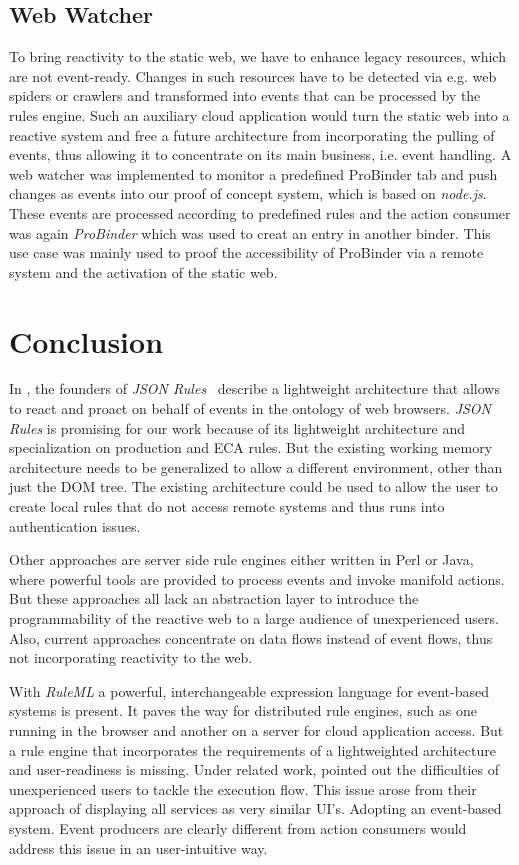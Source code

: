 \documentclass[11pt]{article}%
\begin{document}
\subsection{Web Watcher}
To bring reactivity to the static web, we have to enhance legacy resources, which are not event-ready. Changes in such resources have to be detected via e.g. web spiders or crawlers and transformed into events that can be processed by the rules engine. Such an auxiliary cloud application would turn the static web into a reactive system and free a future architecture from incorporating the pulling of events, thus allowing it to concentrate on its main business, i.e. event handling.
A web watcher was implemented to monitor a predefined ProBinder tab and push changes as events into our proof of concept system, which is based on \emph{node.js}. These events are processed according to predefined rules and the action consumer was again \emph{ProBinder} which was used to creat an entry in another binder. This use case was mainly used to proof the accessibility of ProBinder via a remote system and the activation of the static web.

\section{Conclusion}
In \cite{2009-Pascalau_Giurca-LWAECARE.pdf}, the founders of \emph{JSON Rules}~\cite{2008-Giurca_Pascalau-JSON_Rules.pdf} describe a lightweight architecture that allows to react and proact on behalf of events in the ontology of web browsers. \emph{JSON Rules} is promising for our work because of its lightweight architecture and specialization on production and ECA rules. But the existing working memory architecture needs to be generalized to allow a different environment, other than just the DOM tree. The existing architecture could be used to allow the user to create local rules that do not access remote systems and thus runs into authentication issues.

Other approaches are server side rule engines either written in Perl or Java, where powerful tools are provided to process events and invoke manifold actions. But these approaches all lack an abstraction layer to introduce the programmability of the reactive web to a large audience of unexperienced users. Also, current approaches concentrate on data flows instead of event flows, thus not incorporating reactivity to the web.

With \emph{RuleML} a powerful, interchangeable expression language for event-based systems is present. It paves the way for distributed rule engines, such as one running in the browser and another on a server for cloud application access. But a rule engine that incorporates the requirements of a lightweighted architecture and user-readiness is missing. Under related work, \cite{2010-Namoun_etal-EURCW.pdf} pointed out the difficulties of unexperienced users to tackle the execution flow. This issue arose from their approach of displaying all services as very similar UI's. Adopting an event-based system. Event producers are clearly different from action consumers would address this issue in an user-intuitive way.
\end{document}
